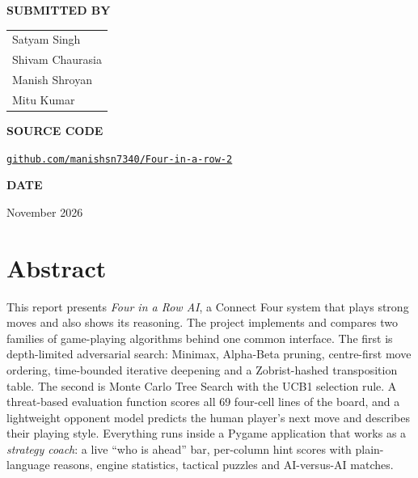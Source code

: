 \documentclass[11pt,a4paper]{article}
\newcommand{\instructor}{}           %
\newcommand{\reportdate}{November 2026}
\newcommand{\repourl}{https://github.com/manishsn7340/Four-in-a-row-2}
\renewcommand{\arraystretch}{1.18}
\begin{document}
\begin{titlepage}
\begin{minipage}[t]{0.55\textwidth}
{\sffamily\small\bfseries\color{muted}SUBMITTED BY}\par\vspace{4pt}
\renewcommand{\arraystretch}{1.35}
\begin{tabular}{@{}l}
\large Satyam Singh\\
\large Shivam Chaurasia\\
\large Manish Shroyan\\
\large Mitu Kumar\\
\end{tabular}
\ifx\instructor\empty\else
\par{}\par\vspace{4pt}{\large\instructor}
\fi
\par\vspace{0.8cm}
{\sffamily\small\bfseries\color{muted}SOURCE CODE}\par\vspace{4pt}
\href{\repourl}{\small\texttt{github.com/manishsn7340/Four-in-a-row-2}}
\par\vspace{0.8cm}
{\sffamily\small\bfseries\color{muted}DATE}\par\vspace{4pt}\reportdate
\end{minipage}
\end{titlepage}

\thispagestyle{plain}
\section*{Abstract}

This report presents \emph{Four in a Row AI}, a Connect Four system that plays strong moves and also shows its reasoning. The project implements and compares two families of game-playing algorithms behind one common interface. The first is depth-limited adversarial search: Minimax, Alpha-Beta pruning, centre-first move ordering, time-bounded iterative deepening and a Zobrist-hashed transposition table. The second is Monte Carlo Tree Search with the UCB1 selection rule. A threat-based evaluation function scores all 69 four-cell lines of the board, and a lightweight opponent model predicts the human player's next move and describes their playing style. Everything runs inside a Pygame application that works as a \emph{strategy coach}: a live ``who is ahead'' bar, per-column hint scores with plain-language reasons, engine statistics, tactical puzzles and AI-versus-AI matches.
\end{document}
